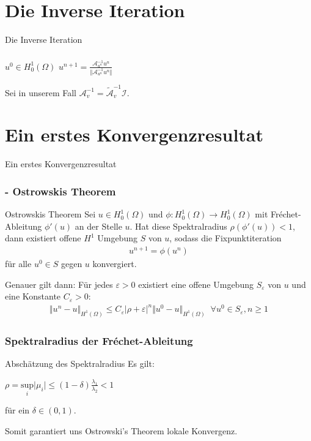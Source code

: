\documentclass{beamer}
\newcommand{\sectionstart}[1]{
    \section{#1}
    \begin{frame}
        \centering
        \huge{#1}
    \end{frame}
}
\newcommand{\Hone}{\ensuremath{{H^1(\Omega)}}}
\newcommand{\Honez}{\ensuremath{{H^1_0(\Omega)}}}
\newcommand{\mA}{\ensuremath{\mathcal{A}}}
\newcommand{\mAh}{\ensuremath{\mathcal{\tilde{A}}}}
\newcommand{\mI}{\ensuremath{\mathcal{I}}}
\begin{document}
    \sectionstart{Die Inverse Iteration}

    \begin{frame}
        \frametitle{\insertsection}

        \begin{algorithm}[H]
            \caption{Inverse Iteration}
            \begin{algorithmic}[1]
                \STATE $u^0 \in \Honez$
                \STATE $u^{n+1} = \frac
                {\mA_{u^n}^{-1} u^n}
                {\Vert \mA_{u^n}^{-1} u^n \Vert}$
                \ENDFOR
            \end{algorithmic}
        \end{algorithm}

        \pause

        Sei in unserem Fall $\mA_v^{-1} = \mAh_v^{-1}\mI$.
    \end{frame}

    \sectionstart{Ein erstes Konvergenzresultat}

    \begin{frame}
        \frametitle{{\insertsection} - Ostrowskis Theorem}
        \begin{block}{Ostrowskis Theorem}
            Sei $u \in \Honez$ und $\phi: \Honez \rightarrow \Honez$ mit Fréchet-Ableitung $\phi'(u)$ an der Stelle $u$.
            Hat diese Spektralradius $\rho(\phi'(u)) < 1$,
            dann existiert offene $H^1$ Umgebung $S$ von $u$, sodass die Fixpunktiteration
            \begin{align*}
                u^{n+1} = \phi(u^n)
            \end{align*}
            für alle $u^0 \in S$ gegen $u$ konvergiert.
        \end{block}

        \pause

        Genauer gilt dann: Für jedes $\varepsilon > 0$ existiert eine offene
        Umgebung $S_\varepsilon$ von $u$ und eine Konstante $C_\varepsilon > 0$:
        \begin{align*}
            \Vert u^n - u \Vert_\Hone \leq C_\varepsilon \vert \rho + \varepsilon \vert^n \Vert u^0 - u \Vert_\Hone\;\; \forall u^0 \in S_\varepsilon, n \geq 1
        \end{align*}
    \end{frame}

    \begin{frame}
        \frametitle{Spektralradius der Fréchet-Ableitung}
        \begin{block}{Abschätzung des Spektralradius}
            Es gilt:
            \begin{center}
                $\rho = \underset{i}{\mathrm{sup}} \vert \mu_i \vert
                \leq (1 - \delta) \frac{\lambda_1}{\lambda_2} < 1$
            \end{center}
            für ein $\delta \in (0,1)$.
        \end{block}

        \bigskip

        Somit garantiert uns Ostrowski's Theorem lokale Konvergenz.
    \end{frame}
\end{document}
